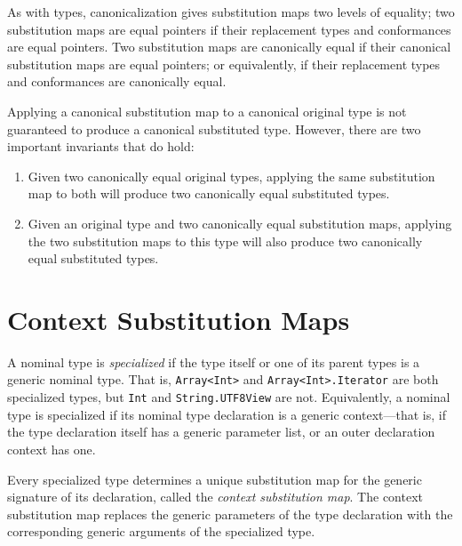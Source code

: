 \documentclass[../generics]{subfiles}
\begin{document}
As with types, canonicalization gives substitution maps two levels of equality; two substitution maps are equal pointers if their replacement types and conformances are equal pointers. Two substitution maps are canonically equal if their canonical substitution maps are equal pointers; or equivalently, if their replacement types and conformances are canonically equal.

Applying a canonical substitution map to a canonical original type is not guaranteed to produce a canonical substituted type. However, there are two important invariants that do hold:
\begin{enumerate}
\item Given two canonically equal original types, applying the same substitution map to both will produce two canonically equal substituted types.
\item Given an original type and two canonically equal substitution maps, applying the two substitution maps to this type will also produce two canonically equal substituted types.
\end{enumerate}

\section{Context Substitution Maps}\label{contextsubstmap}

A nominal type is \emph{specialized} if the type itself or one of its parent types is a generic nominal type. That is, \texttt{Array<Int>} and \texttt{Array<Int>.Iterator} are both specialized types, but \texttt{Int} and \texttt{String.UTF8View} are not. Equivalently, a nominal type is specialized if its nominal type declaration is a generic context---that is, if the type declaration itself has a generic parameter list, or an outer declaration context has one.

Every specialized type determines a unique substitution map for the generic signature of its declaration, called the \emph{context substitution map}. The context substitution map replaces the generic parameters of the type declaration with the corresponding generic arguments of the specialized type.
\end{document}
